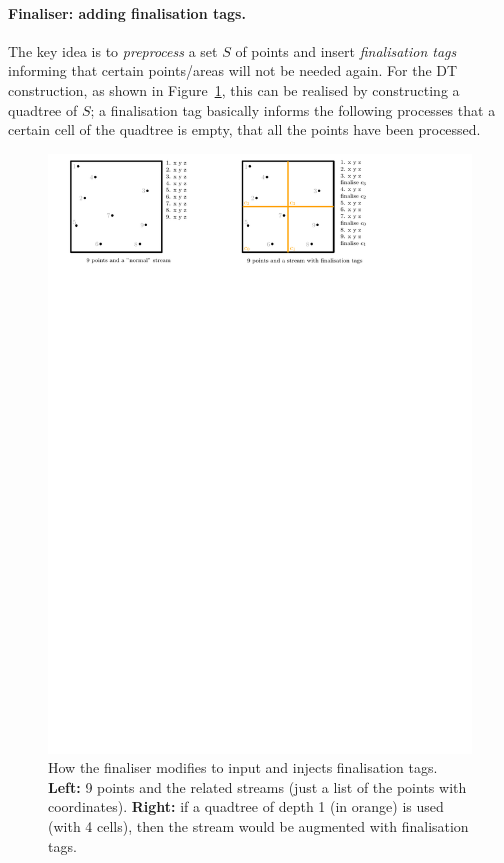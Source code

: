\paragraph{Finaliser: adding finalisation tags.}
The key idea is to \emph{preprocess} a set $S$ of points and insert \emph{finalisation tags} informing that certain points/areas will not be needed again.
For the DT construction, as shown in Figure~\ref{fig:finaliser}, this can be realised by constructing a quadtree of $S$; a finalisation tag basically informs the following processes that a certain cell of the quadtree is empty, that all the points have been processed.
\begin{figure}
  \centering
  \includegraphics[width=\linewidth]{figs/finaliser}
  \caption{How the finaliser modifies to input and injects finalisation tags. \textbf{Left:} 9 points and the related streams (just a list of the points with coordinates). \textbf{Right:} if a quadtree of depth 1 (in orange) is used (with 4 cells), then the stream would be augmented with finalisation tags.}%
\label{fig:finaliser}
\end{figure}


